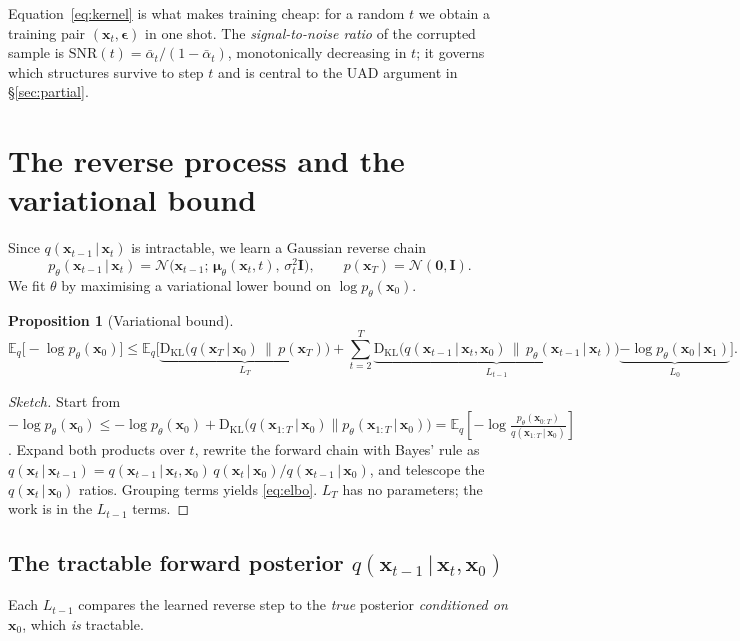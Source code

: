 \documentclass[12pt,a4paper]{article}
\newtheorem{proposition}{Proposition}
\newcommand{\E}{\mathbb{E}}
\newcommand{\N}{\mathcal{N}}
\newcommand{\KL}{\mathrm{D_{KL}}}
\newcommand{\x}{\bm{x}}
\newcommand{\eps}{\bm{\epsilon}}
\newcommand{\II}{\mathbf{I}}
\newcommand{\abar}{\bar{\alpha}}
\newcommand{\given}{\,\vert\,}
\begin{document}
\noindent Equation~\eqref{eq:kernel} is what makes training cheap: for a random
$t$ we obtain a training pair $(\x_t,\eps)$ in one shot. The
\emph{signal-to-noise ratio} of the corrupted sample is
$\mathrm{SNR}(t)=\abar_t/(1-\abar_t)$, monotonically decreasing in $t$; it
governs which structures survive to step $t$ and is central to the UAD argument
in \S\ref{sec:partial}.

\section{The reverse process and the variational bound}
Since $q(\x_{t-1}\given\x_t)$ is intractable, we learn a Gaussian reverse chain
\begin{equation}
p_\theta(\x_{t-1}\given\x_t)=\N\!\big(\x_{t-1};\,\bm\mu_\theta(\x_t,t),\,\sigma_t^2\II\big),
\qquad p(\x_T)=\N(\bm0,\II).
\label{eq:rev}
\end{equation}
We fit $\theta$ by maximising a variational lower bound on $\log p_\theta(\x_0)$.

\begin{proposition}[Variational bound]
\begin{equation}
\E_q\!\big[-\log p_\theta(\x_0)\big]\le
\E_q\Big[\underbrace{\KL\!\big(q(\x_T\given\x_0)\,\|\,p(\x_T)\big)}_{L_T}
+\!\sum_{t=2}^{T}\underbrace{\KL\!\big(q(\x_{t-1}\given\x_t,\x_0)\,\|\,p_\theta(\x_{t-1}\given\x_t)\big)}_{L_{t-1}}
\underbrace{-\log p_\theta(\x_0\given\x_1)}_{L_0}\Big].
\label{eq:elbo}
\end{equation}
\end{proposition}
\begin{proof}[Sketch]
Start from $-\log p_\theta(\x_0)\le -\log p_\theta(\x_0)+\KL\big(q(\x_{1:T}\given\x_0)\|p_\theta(\x_{1:T}\given\x_0)\big)
=\E_q[-\log \frac{p_\theta(\x_{0:T})}{q(\x_{1:T}\given\x_0)}]$.
Expand both products over $t$, rewrite the forward chain with Bayes' rule as
$q(\x_t\given\x_{t-1})=q(\x_{t-1}\given\x_t,\x_0)\,q(\x_t\given\x_0)/q(\x_{t-1}\given\x_0)$,
and telescope the $q(\x_t\given\x_0)$ ratios. Grouping terms yields
\eqref{eq:elbo}. $L_T$ has no parameters; the work is in the $L_{t-1}$ terms.
\end{proof}

\subsection{The tractable forward posterior \texorpdfstring{$q(\x_{t-1}\given\x_t,\x_0)$}{q(x\_\{t-1\} | x\_t, x\_0)}}
Each $L_{t-1}$ compares the learned reverse step to the \emph{true} posterior
\emph{conditioned on $\x_0$}, which \emph{is} tractable.
\end{document}
